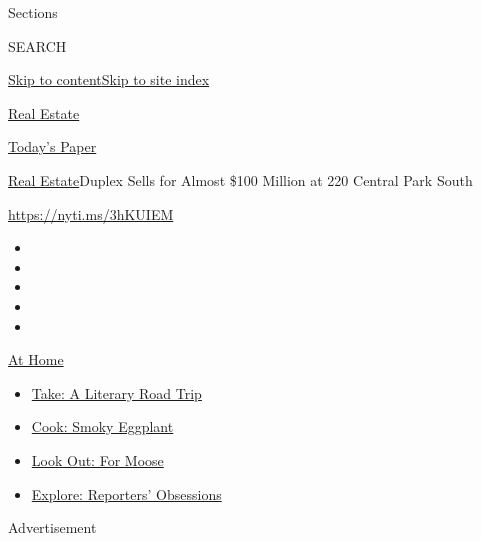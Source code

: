 Sections

SEARCH

\protect\hyperlink{site-content}{Skip to
content}\protect\hyperlink{site-index}{Skip to site index}

\href{https://www.nytimes.com/section/realestate}{Real Estate}

\href{https://myaccount.nytimes.com/auth/login?response_type=cookie\&client_id=vi}{}

\href{https://www.nytimes.com/section/todayspaper}{Today's Paper}

\href{/section/realestate}{Real Estate}\textbar{}Duplex Sells for Almost
\$100 Million at 220 Central Park South

\url{https://nyti.ms/3hKUIEM}

\begin{itemize}
\item
\item
\item
\item
\item
\end{itemize}

\href{https://www.nytimes.com/spotlight/at-home?action=click\&pgtype=Article\&state=default\&region=TOP_BANNER\&context=at_home_menu}{At
Home}

\begin{itemize}
\tightlist
\item
  \href{https://www.nytimes.com/2020/07/28/books/time-for-a-literary-road-trip.html?action=click\&pgtype=Article\&state=default\&region=TOP_BANNER\&context=at_home_menu}{Take:
  A Literary Road Trip}
\item
  \href{https://www.nytimes.com/2020/07/29/magazine/bored-with-your-home-cooking-some-smoky-eggplant-will-fix-that.html?action=click\&pgtype=Article\&state=default\&region=TOP_BANNER\&context=at_home_menu}{Cook:
  Smoky Eggplant}
\item
  \href{https://www.nytimes.com/2020/07/27/travel/moose-michigan-isle-royale.html?action=click\&pgtype=Article\&state=default\&region=TOP_BANNER\&context=at_home_menu}{Look
  Out: For Moose}
\item
  \href{https://www.nytimes.com/interactive/2020/at-home/even-more-reporters-editors-diaries-lists-recommendations.html?action=click\&pgtype=Article\&state=default\&region=TOP_BANNER\&context=at_home_menu}{Explore:
  Reporters' Obsessions}
\end{itemize}

Advertisement

